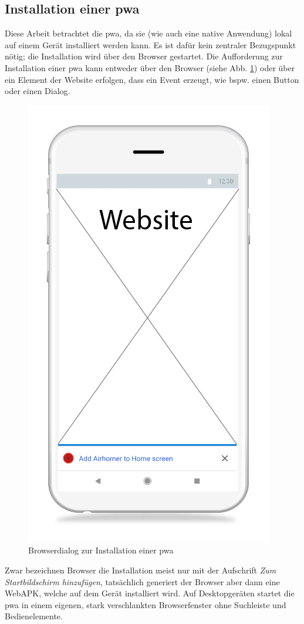 \subsection{Installation einer \acf{pwa}}
Diese Arbeit betrachtet die \ac{pwa}, da sie (wie auch eine native Anwendung) lokal auf einem Gerät installiert werden kann. Es ist dafür kein zentraler Bezugspunkt nötig; die Installation wird über den Browser gestartet. Die Aufforderung zur Installation einer \ac{pwa} kann entweder über den Browser (siehe Abb. \ref{fig:pwainstallationprompt}) oder über ein Element der Website erfolgen, dass ein Event erzeugt, wie bspw. einen Button oder einen Dialog.

\begin{figure}[h!]
	\centering
	\includegraphics[width=0.5\linewidth]{img/fig/2-4-1_Install_PWA_Wireframe}
	\caption{Browserdialog zur Installation einer \ac{pwa} \cite{PWAAddToHomeScreenPrompt}}
	\label{fig:pwainstallationprompt}
\end{figure}

\newpage
 

Zwar bezeichnen Browser die Installation meist nur mit der Aufschrift \textit{Zum Startbildschirm hinzufügen}, tatsächlich generiert der Browser aber dann eine WebAPK, welche auf dem Gerät installiert wird. Auf Desktopgeräten startet die \ac{pwa} in einem eigenen, stark verschlankten Browserfenster ohne Suchleiste und Bedienelemente. \cite{GooglePWAInstallation}

